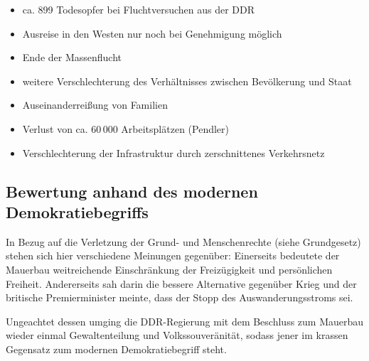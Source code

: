 \begin{itemize}
\item ca. 899 Todesopfer bei Fluchtversuchen aus der DDR
\item Ausreise in den Westen nur noch bei Genehmigung
möglich
\item Ende der Massenflucht
\item weitere Verschlechterung des Verhältnisses zwischen Bevölkerung
und Staat
\item Auseinanderreißung von Familien
\item Verlust von ca. 60\,000 Arbeitsplätzen (Pendler)
\item Verschlechterung der Infrastruktur durch zerschnittenes
Verkehrsnetz
\end{itemize}

\subsection*{Bewertung anhand des modernen Demokratiebegriffs}

In Bezug auf die Verletzung der Grund- und Menschenrechte (siehe
Grundgesetz) stehen sich hier verschiedene Meinungen gegenüber:
Einerseits bedeutete der Mauerbau weitreichende Einschränkung der
Freizügigkeit und persönlichen Freiheit. Andererseits sah
 darin die bessere Alternative
gegenüber Krieg und der britische Premierminister
 meinte, dass der
Stopp des Auswanderungsstroms
 sei.

Ungeachtet dessen umging die DDR-Regierung mit dem Beschluss zum
Mauerbau wieder einmal Gewaltenteilung und Volkssouveränität, sodass
jener im krassen Gegensatz zum modernen Demokratiebegriff steht.

\endinput
